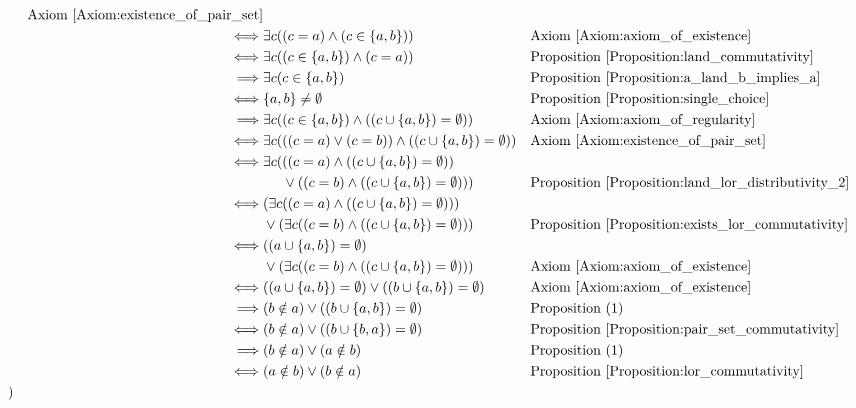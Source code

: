 \begin{prop}
\begin{align*}
& & \text{Axiom \ref{Axiom:existence_of_pair_set}} \\
& & \iff & \exists c ((c = a) \land (c \in \{ a , b \}))
& & \text{Axiom \ref{Axiom:axiom_of_existence}} \\
& & \iff & \exists c ((c \in \{ a , b \}) \land (c = a))
& & \text{Proposition \ref{Proposition:land_commutativity}} \\
& & \implies & \exists c (c \in \{ a , b \})
& & \text{Proposition \ref{Proposition:a_land_b_implies_a}} \\
& & \iff & \{ a , b \} \neq \emptyset
& & \text{Proposition \ref{Proposition:single_choice}} \\
& & \implies & \exists c ((c \in \{ a , b \}) \land ((c \cup \{ a , b \}) = \emptyset))
& & \text{Axiom \ref{Axiom:axiom_of_regularity}} \\
& & \iff & \exists c (((c = a) \lor (c = b)) \land ((c \cup \{ a , b \}) = \emptyset))
& & \text{Axiom \ref{Axiom:existence_of_pair_set}} \\
& & \iff & \exists c (((c = a) \land ((c \cup \{ a , b \}) = \emptyset)) \\
& & & \phantom{\exists c (} \lor ((c = b) \land ((c \cup \{ a , b \}) = \emptyset)))
& & \text{Proposition \ref{Proposition:land_lor_distributivity_2}} \\
& & \iff & (\exists c ((c = a) \land ((c \cup \{ a , b \}) = \emptyset))) \\
& & & \lor (\exists c ((c = b) \land ((c \cup \{ a , b \}) = \emptyset)))
& & \text{Proposition \ref{Proposition:exists_lor_commutativity}} \\
& & \iff & ((a \cup \{ a , b \}) = \emptyset) \\
& & & \lor (\exists c ((c = b) \land ((c \cup \{ a , b \}) = \emptyset)))
& & \text{Axiom \ref{Axiom:axiom_of_existence}} \\
& & \iff & ((a \cup \{ a , b \}) = \emptyset) \lor ((b \cup \{ a , b \}) = \emptyset)
& & \text{Axiom \ref{Axiom:axiom_of_existence}} \\
& & \implies & (b \notin a) \lor ((b \cup \{ a , b \}) = \emptyset)
& & \text{Proposition (1)} \\
& & \iff & (b \notin a) \lor ((b \cup \{ b , a \}) = \emptyset)
& & \text{Proposition \ref{Proposition:pair_set_commutativity}} \\
& & \implies & (b \notin a) \lor (a \notin b)
& & \text{Proposition (1)} \\
& & \iff & (a \notin b) \lor (b \notin a)
& & \text{Proposition \ref{Proposition:lor_commutativity}} \\
& )
\end{align*}
\end{prop}

